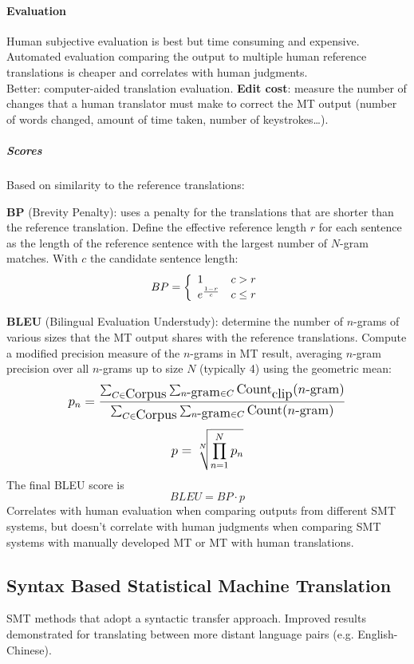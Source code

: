\documentclass[10pt]{report}
\begin{document}
\paragraph{Evaluation} Human subjective evaluation is best but time consuming and expensive. Automated evaluation comparing the output to multiple human reference translations is cheaper and correlates with human judgments.\\
Better: computer-aided translation evaluation. \textbf{Edit cost}: measure the number of changes that a human translator must make to correct the MT output (number of words changed, amount of time taken, number of keystrokes\ldots).
\subparagraph{Scores} Based on similarity to the reference translations:
\begin{list}{}{}
	\item \textbf{BP} (Brevity Penalty): uses a penalty for the translations that are shorter than the reference translation. Define the effective reference length $r$ for each sentence as the length of the reference sentence with the largest number of $N$-gram matches. With $c$ the candidate sentence length:
	$$BP = \left\{\begin{array}{l l}
	1&c > r\\
	e^{\frac{1-r}{c}}& c\leq r
	\end{array}\right.$$
	\item \textbf{BLEU} (Bilingual Evaluation Understudy): determine the number of $n$-grams of various sizes that the MT output shares with the reference translations. Compute a modified precision measure of the $n$-grams in MT result, averaging $n$-gram precision over all $n$-grams up to size $N$ (typically 4) using the geometric mean:
	$$\mathlarger{p_n = \frac{\sum_{C\in\hbox{Corpus}}\sum_{n\hbox{-gram}\in C}\hbox{Count}_{\hbox{clip}}(n\hbox{-gram})}{\sum_{C\in\hbox{Corpus}}\sum_{n\hbox{-gram}\in C}\hbox{Count}(n\hbox{-gram})}}$$
	$$\mathlarger{p = \sqrt[N]{\prod_{n=1}^Np_n}}$$
	The final BLEU score is 
	$$BLEU = BP\cdot p$$
	Correlates with human evaluation when comparing outputs from different SMT systems, but doesn't correlate with human judgments when comparing SMT systems with manually developed MT or MT with human translations.
\end{list}
\subsection{Syntax Based Statistical Machine Translation} SMT methods that adopt a syntactic transfer approach. Improved results demonstrated for translating between more distant language pairs (e.g. English-Chinese).
\end{document}

